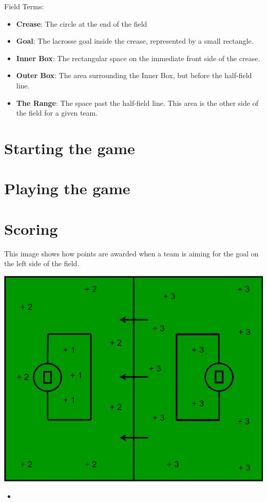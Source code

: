 \documentclass[10pt]{article}
\begin{document}
    Field Terms:
    \begin{itemize}
        \item \textbf{Crease}: The circle at the end of the field
        \item \textbf{Goal}: The lacrosse goal inside the crease, represented by a small rectangle.
        \item \textbf{Inner Box}: The rectangular space on the immediate front side of the crease.
        \item \textbf{Outer Box}: The area surrounding the Inner Box, but before the half-field line.
        \item \textbf{The Range}: The space past the half-field line. This area is the other side of the field for a given team.
    \end{itemize}

    \section{Starting the game}
    \section{Playing the game}
    \section{Scoring}

    This image shows how points are awarded when a team is aiming for the goal on the left side of the field.

    \vspace{5pt}

    \includegraphics[width=.7\textwidth]{field/field_points}

    \begin{itemize}
        \item 
    \end{itemize}
\end{document}
